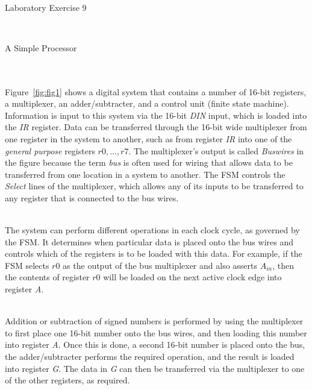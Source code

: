 \documentclass[epsfig,10pt,fullpage]{article} \addtolength{\textwidth}{1.5in}
\begin{document}
~\\
\centerline{\huge Laboratory Exercise 9}
~\\
\centerline{\large A Simple Processor}
~\\
~\\
Figure~\ref{fig:fig1} shows a digital system that contains a number of 16-bit registers,
a multiplexer, an adder/subtracter, and a control unit (finite state machine).  Information
is input to this system via the 16-bit {\it DIN} input, which is loaded into the {\it IR} 
register. Data can be transferred through the 16-bit wide multiplexer from one register
in the system to another, such as from register {\it IR} into one of the {\it general 
purpose} registers $r0, \ldots, r7$.  The multiplexer's output is called {\it Buswires} 
in the figure because the term {\it bus} is often used for wiring that allows data to be 
transferred from one location in a system to another. The FSM controls the {\it Select} 
lines of the multiplexer, which allows any of its inputs to be transferred to any register
that is connected to the bus wires.

~\\
The system can perform different operations in each clock cycle, as governed by the FSM. 
It determines when particular data is placed onto the bus wires and controls which of the 
registers is to be loaded with this data. For example, if the FSM selects $r0$ as the output of the 
bus multiplexer and also asserts $A_{in}$, then the contents of register $r0$ will be loaded on the 
next active clock edge into register {\it A}.

~\\
Addition or subtraction of signed numbers is performed by using the multiplexer to first 
place one 16-bit number onto the bus wires, and then loading this number into register {\it A}. 
Once this is done, a second 16-bit number is placed onto the bus, the adder/subtracter
performs the required operation, and the result is loaded into register {\it G}. The
data in {\it G} can then be transferred via the multiplexer to one of the other registers,
as required.
\end{document}
